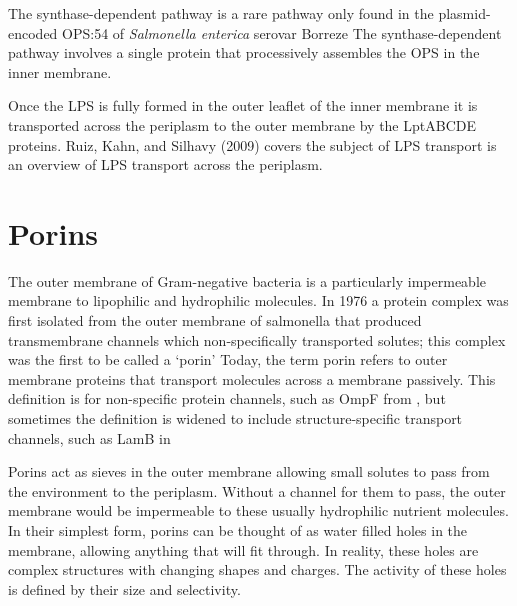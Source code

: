 The synthase-dependent pathway is a rare pathway only found in the plasmid-encoded \ac{OPS}:54 of \textit{Salmonella enterica} serovar Borreze The
synthase-dependent pathway involves a single protein that processively assembles the \ac{OPS} in the inner membrane.

Once the \ac{LPS} is fully formed in the outer leaflet of the inner membrane it is transported across the periplasm to the outer membrane by the LptABCDE proteins. Ruiz, Kahn, and
Silhavy (2009) covers the subject of \ac{LPS} transport  is an overview of \ac{LPS} transport across the periplasm.
 
  \section{Porins} \label{sec:intro-porins}
 
The outer membrane of Gram-negative bacteria is a particularly impermeable membrane to lipophilic and hydrophilic molecules. In 1976 a protein complex was first isolated from the
outer membrane of \ac{salmonella} that produced transmembrane channels which non-specifically transported solutes; this complex was the first to be called a
`porin' Today, the term porin refers to outer membrane proteins that transport molecules across a membrane passively. This definition is for non-specific
protein channels, such as OmpF from \ecoli{}, but sometimes the definition is widened to include structure-specific transport channels, such as LamB
in \ecoli{}

Porins act as sieves in the outer membrane allowing small solutes to pass from the environment to the periplasm. Without a channel for them to pass, the outer membrane would be
impermeable to these usually hydrophilic nutrient molecules. In their simplest form, porins can be thought of as water filled holes in the membrane, allowing anything that will fit
through. In reality, these holes are complex structures with changing shapes and charges. The activity of these holes is defined by their size and selectivity.

